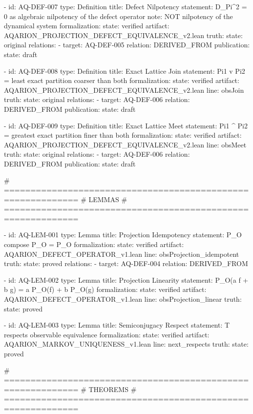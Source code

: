 {{{{{{{{{{{{{  - id: AQ-DEF-007
    type: Definition
    title: Defect Nilpotency
    statement: D_Pi^2 = 0 as algebraic nilpotency of the defect operator
    note: NOT nilpotency of the dynamical system
    formalization:
      state: verified
      artifact: AQARION_PROJECTION_DEFECT_EQUIVALENCE_v2.lean
    truth:
      state: original
    relations:
      - target: AQ-DEF-005
        relation: DERIVED_FROM
    publication:
      state: draft

  - id: AQ-DEF-008
    type: Definition
    title: Exact Lattice Join
    statement: Pi1 v Pi2 = least exact partition coarser than both
    formalization:
      state: verified
      artifact: AQARION_PROJECTION_DEFECT_EQUIVALENCE_v2.lean
      line: obsJoin
    truth:
      state: original
    relations:
      - target: AQ-DEF-006
        relation: DERIVED_FROM
    publication:
      state: draft

  - id: AQ-DEF-009
    type: Definition
    title: Exact Lattice Meet
    statement: Pi1 ^ Pi2 = greatest exact partition finer than both
    formalization:
      state: verified
      artifact: AQARION_PROJECTION_DEFECT_EQUIVALENCE_v2.lean
      line: obsMeet
    truth:
      state: original
    relations:
      - target: AQ-DEF-006
        relation: DERIVED_FROM
    publication:
      state: draft

  # ============================================================
  # LEMMAS
  # ============================================================

  - id: AQ-LEM-001
    type: Lemma
    title: Projection Idempotency
    statement: P_O compose P_O = P_O
    formalization:
      state: verified
      artifact: AQARION_DEFECT_OPERATOR_v1.lean
      line: obsProjection_idempotent
    truth:
      state: proved
    relations:
      - target: AQ-DEF-004
        relation: DERIVED_FROM

  - id: AQ-LEM-002
    type: Lemma
    title: Projection Linearity
    statement: P_O(a f + b g) = a P_O(f) + b P_O(g)
    formalization:
      state: verified
      artifact: AQARION_DEFECT_OPERATOR_v1.lean
      line: obsProjection_linear
    truth:
      state: proved

  - id: AQ-LEM-003
    type: Lemma
    title: Semiconjugacy Respect
    statement: T respects observable equivalence
    formalization:
      state: verified
      artifact: AQARION_MARKOV_UNIQUENESS_v1.lean
      line: next_respects
    truth:
      state: proved

  # ============================================================
  # THEOREMS
  # ============================================================

}}}}}}}}}}}}}

